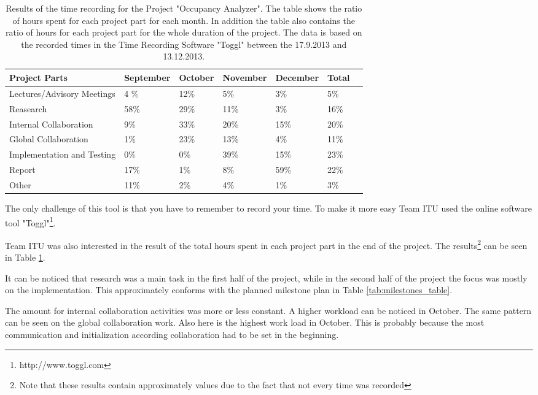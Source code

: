 \begin{table}[htb]
	\centering
	\begin{tabular}{ |  p{} |  p{2cm} |  p{2cm} |  p{2cm} |  p{2cm} |  p{2cm} |  p{2cm}|}
    		\hline
   		Project Parts & September & October & November & December & Total\\ \hline
    		Lectures/Advisory Meetings & 4 \% & 12\% & 5\% & 3\% & 5\% \\ \hline
    		Reasearch & 58\% & 29\% & 11\% & 3\% & 16\% \\ \hline
		Internal Collaboration & 9\% & 33\% & 20\% & 15\% & 20\%\\ \hline
    		Global Collaboration & 1\% & 23\% & 13\% & 4\% & 11\%\\ \hline
    		Implementation and Testing & 0\% & 0\% & 39\% & 15\% & 23\% \\ \hline
    		Report & 17\% & 1\%  & 8\% & 59\% & 22\% \\ \hline
 		Other & 11\% & 2\% & 4\% & 1\% & 3\%\\ \hline
	\end{tabular}
	\caption{Results of the time recording for the Project "Occupancy Analyzer". The table shows the ratio of hours spent for each project part for each month. In addition the table also contains the ratio of hours for each project part for the whole duration of the project. The data is based on the recorded times in the Time Recording Software "Toggl" between the 17.9.2013 and 13.12.2013.}
	\label{tab:timeRecResults}
\end{table}

The only challenge of this tool is that you have to remember to record your time. To make it more easy Team ITU used the online software tool "Toggl"\footnote{http://www.toggl.com}.

Team ITU was also interested in the result of the total hours spent in each project part in the end of the project. The results\footnote{Note that these results contain approximately values due to the fact that not every time was recorded} can be seen in Table \ref{tab:timeRecResults}.

It can be noticed that research was a main task in the first half of the project, while in the second half of the project the focus was mostly on the implementation. This approximately conforms with the planned milestone plan in Table \ref{tab:milestones_table}.

The amount for internal collaboration activities was more or less constant. A higher workload can be noticed in October. The same pattern can be seen on the global collaboration work. Also here is the highest work load in October. This is probably because the most communication and initialization according collaboration had to be set in the beginning.

